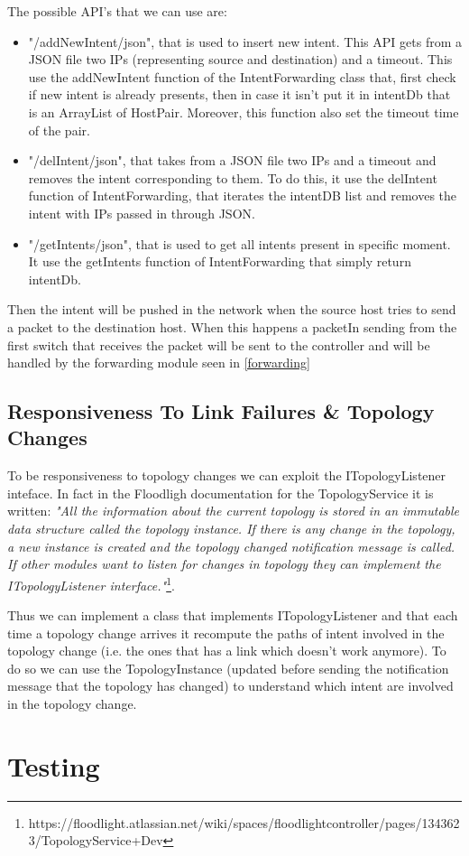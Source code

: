 \documentclass[a4paper]{report}
\begin{document}
	\noindent The possible API’s that we can use are:
        \begin{itemize}
        \item "/addNewIntent/json", that is used to insert new intent. This API gets from a JSON file two IPs (representing source and destination) and a timeout. This use the addNewIntent function of the IntentForwarding class that, first check if new intent is already presents, then in case it isn’t put it in intentDb that is an ArrayList of HostPair. Moreover, this function also set the timeout time of the pair.
        \item "/delIntent/json", that takes from a JSON file two IPs and a timeout and removes the intent corresponding to them. To do this, it use the delIntent function of IntentForwarding, that iterates the intentDB list and removes the intent with IPs passed in through JSON.
	\item "/getIntents/json", that is used to get all intents present in specific moment. It use the getIntents function of IntentForwarding that simply return intentDb.
        \end{itemize}

	
	
	\noindent Then the intent will be pushed in the network when the source host tries to send a packet to the destination host. When this happens a packetIn sending from the first switch that receives the packet will be sent to the controller and will be handled by the forwarding module seen in \ref{forwarding}
	
	\section{Responsiveness To Link Failures \& Topology Changes}
	To be responsiveness to topology changes we can exploit the ITopologyListener inteface. In fact in the Floodligh documentation for the TopologyService it is written: \textit{"All the information about the current topology is stored in an immutable data structure called the topology instance. If there is any change in the topology, a new instance is created and the topology changed notification message is called. If other modules want to listen for changes in topology they can implement the ITopologyListener interface."}\footnote{https://floodlight.atlassian.net/wiki/spaces/floodlightcontroller/pages/1343623/TopologyService+Dev}.
	
	\noindent Thus we can implement a class that implements ITopologyListener and that each time a topology change arrives it recompute the paths of intent involved in the topology change (i.e. the ones that has a link which doesn't work anymore). To do so we can use the TopologyInstance (updated before sending the notification message that the topology has changed) to understand which intent are involved in the topology change.
	
	\chapter{Testing}
	
\end{document}
